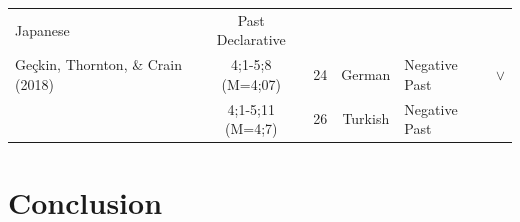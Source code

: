 \documentclass[oneside]{report}
\theoremstyle{definition}
\theoremstyle{definition}
\theoremstyle{definition}
\theoremstyle{remark}
\begin{document}
\begin{longtable}[]{@{}lccclc@{}}
\begin{minipage}[t]{0.10\columnwidth}
Japanese\strut
\end{minipage} & \begin{minipage}[t]{0.25\columnwidth}\raggedright\strut
Past Declarative\strut
\end{minipage} & \begin{minipage}[t]{0.13\columnwidth}\centering\strut
\strut
\end{minipage}\tabularnewline
\begin{minipage}[t]{0.23\columnwidth}\raggedright\strut
Geçkin, Thornton, \& Crain (2018)\strut
\end{minipage} & \begin{minipage}[t]{0.07\columnwidth}\centering\strut
4;1-5;8 (M=4;07)\strut
\end{minipage} & \begin{minipage}[t]{0.05\columnwidth}\centering\strut
24\strut
\end{minipage} & \begin{minipage}[t]{0.10\columnwidth}\centering\strut
German\strut
\end{minipage} & \begin{minipage}[t]{0.25\columnwidth}\raggedright\strut
Negative Past\strut
\end{minipage} & \begin{minipage}[t]{0.13\columnwidth}\centering\strut
\(\lor\)\strut
\end{minipage}\tabularnewline
\begin{minipage}[t]{0.23\columnwidth}\raggedright\strut
\strut
\end{minipage} & \begin{minipage}[t]{0.07\columnwidth}\centering\strut
4;1-5;11 (M=4;7)\strut
\end{minipage} & \begin{minipage}[t]{0.05\columnwidth}\centering\strut
26\strut
\end{minipage} & \begin{minipage}[t]{0.10\columnwidth}\centering\strut
Turkish\strut
\end{minipage} & \begin{minipage}[t]{0.25\columnwidth}\raggedright\strut
Negative Past\strut
\end{minipage} & \begin{minipage}[t]{0.13\columnwidth}\centering\strut
\strut
\end{minipage}\tabularnewline
\bottomrule
\end{longtable}
\section{Conclusion}\label{conclusion-1}
\end{document}
